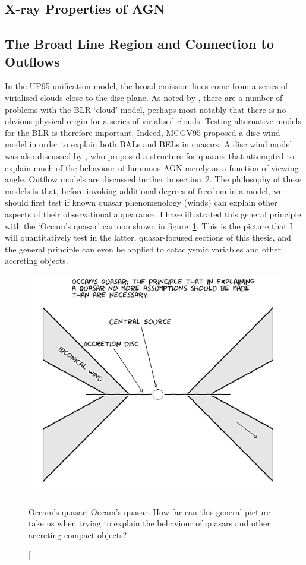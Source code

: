 \subsection{X-ray Properties of AGN}



\subsection{The Broad Line Region and Connection to Outflows}

In the UP95 unification model, the broad emission lines
come from a series of virialised clouds close to the disc plane.
As noted by \cite[][hereafter MCGV95]{MCGV95}, there are a number of problems with
the BLR `cloud' model, perhaps most notably that there is no obvious 
physical origin for a series of virialised clouds. 
Testing alternative models for the BLR is therefore important.
Indeed, MCGV95 proposed a disc wind model in order to explain both BALs and BELs
in quasars. A disc wind model was also  discussed by \cite{elvis2000}, 
who proposed a structure for quasars that attempted to explain much 
of the behaviour of luminous AGN
merely as a function of viewing angle. Outflow models are discussed further in section~2.
The philosophy of these models is that, before invoking additional
degrees of freedom in a model, we should first test if known quasar phenomenology 
(winds) can explain other aspects of their observational appearance.
I have illustrated this general principle with the `Occam's quasar' 
cartoon shown in figure~\ref{fig:occam}. This is the picture that I will
quantitatively test in the latter, quasar-focused sections of this thesis, and the general
principle can even be applied to cataclysmic variables and other accreting objects.


\begin{figure}
\centering
\includegraphics[width=1.0\textwidth]{figures/01-intro/occam.jpg}
\caption
[Occam's quasar]
{
Occam's quasar. How far can this general picture take us when trying to explain
the behaviour of quasars and other accreting compact objects?
} 
\label{fig:occam}
\end{figure}


